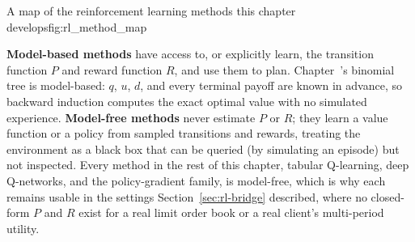 \documentclass[../ai_in_finance]{subfiles}
\begin{document}
\begin{bookfigure}[htbp]{A map of the reinforcement learning methods this chapter develops}{fig:rl_method_map}
\end{bookfigure}

\textbf{Model-based methods} have access to, or explicitly learn, the transition function $P$ and reward function $R$, and use them to plan. Chapter~'s binomial tree is model-based: $q$, $u$, $d$, and every terminal payoff are known in advance, so backward induction computes the exact optimal value with no simulated experience. \textbf{Model-free methods} never estimate $P$ or $R$; they learn a value function or a policy from sampled transitions and rewards, treating the environment as a black box that can be queried (by simulating an episode) but not inspected. Every method in the rest of this chapter, tabular Q-learning, deep Q-networks, and the policy-gradient family, is model-free, which is why each remains usable in the settings Section~\ref{sec:rl-bridge} described, where no closed-form $P$ and $R$ exist for a real limit order book or a real client's multi-period utility.
\end{document}
